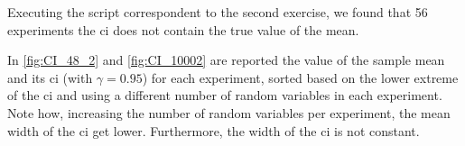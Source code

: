 \documentclass[11pt,a4paper]{article}
\begin{document}
Executing the script correspondent to the second exercise, we found that 56 experiments the \gls{ci} does not contain the true value of the mean.

In \autoref{fig:CI_48_2} and \autoref{fig:CI_10002} are reported the value of the sample mean and its \gls{ci} (with $\gamma=0.95$) for each experiment, sorted based on the lower extreme of the \gls{ci} and using a different number of random variables in each experiment.
Note how, increasing the number of random variables per experiment, the mean width of the \gls{ci} get lower. Furthermore, the width of the \gls{ci} is not constant.
\end{document}
